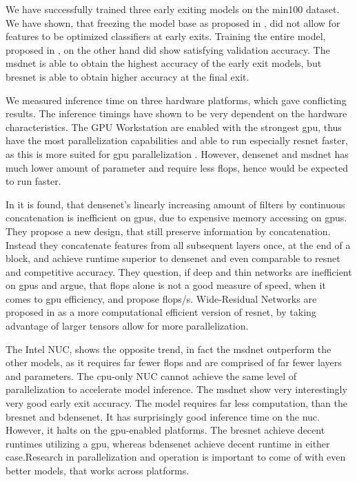 We have successfully trained three early exiting models on the \gls{min100} dataset. We have shown, that freezing the model base as proposed in \cite{leroux_resource-constrained_2015}, did not allow for features to be optimized classifiers at early exits. Training the entire model, proposed in \cite{teerapittayanon_branchynet:_2016}, on the other hand did show satisfying validation accuracy. The \gls{msdnet} is able to obtain the highest accuracy of the early exit models, but \gls{bresnet} is able to obtain higher accuracy at the final exit. 

We measured inference time on three hardware platforms, which gave conflicting results. The inference timings have shown to be very dependent on the hardware characteristics. The GPU Workstation are enabled with the strongest \gls{gpu}, thus have the most parallelization capabilities and able to run especially \gls{resnet} faster, as this is more suited for \gls{gpu} parallelization \cite{lee_energy_2019}. However, \gls{densenet} and \gls{msdnet} has much lower amount of parameter and require less \gls{flop}s, hence would be expected to run faster. 

In \cite{lee_energy_2019} it is found, that \gls{densenet}'s linearly increasing amount of filters by continuous concatenation is inefficient on \gls{gpu}s, due to expensive memory accessing on \gls{gpu}s. They propose a new design, that still preserve information by concatenation. Instead they concatenate features from all subsequent layers once, at the end of a block, and achieve runtime superior to \gls{densenet} and even comparable to \gls{resnet} and competitive accuracy. They question, if deep and thin networks are inefficient on \gls{gpu}s and argue, that \gls{flop}s alone is not a good measure of speed, when it comes to \gls{gpu} efficiency, and propose \gls{flop}s/s. Wide-Residual Networks are proposed in \cite{zagoruyko_wide_2017} as a more computational efficient version of \gls{resnet}, by taking advantage of larger tensors allow for more parallelization. 

The Intel NUC, shows the opposite trend, in fact the \gls{msdnet} outperform the other models, as it requires far fewer \gls{flop}s and are comprised of far fewer layers and parameters. The \gls{cpu}-only NUC cannot achieve the same level of parallelization to accelerate model inference. The \gls{msdnet} \cite{huang_multi-scale_2017} show very interestingly very good early exit accuracy. The model requires far less computation, than the \gls{bresnet} and \gls{bdensenet}. It has surprisingly good inference time on the \gls{nuc}. However, it halts on the \gls{gpu}-enabled platforms. The \gls{bresnet} achieve decent runtimes utilizing a \gls{gpu}, whereas \gls{bdensenet} achieve decent runtime in either case.Research in parallelization and operation is important to come of with even better models, that works across platforms.

